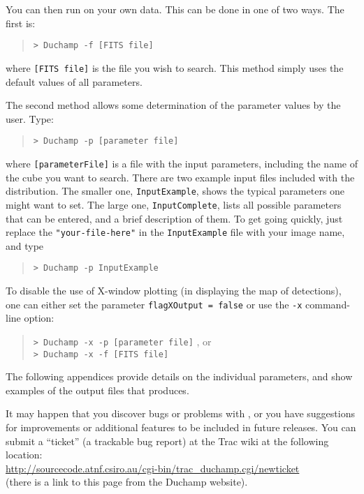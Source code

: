 You can then run \duchamp on your own data. This can be done in one
of two ways. The first is:
\begin{quote}
{\footnotesize
\texttt{> Duchamp -f [FITS file]}
}
\end{quote}
where \texttt{[FITS file]} is the file you wish to search. This method
simply uses the default values of all parameters.

The second method allows some determination of the parameter values by
the user. Type:
\begin{quote}
{\footnotesize
\texttt{> Duchamp -p [parameter file]}
}
\end{quote}
where \texttt{[parameterFile]} is a file with the input parameters,
including the name of the cube you want to search. There are two
example input files included with the distribution. The smaller one,
\texttt{InputExample}, shows the typical parameters one might want to
set. The large one, \texttt{InputComplete}, lists all possible
parameters that can be entered, and a brief description of them. To
get going quickly, just replace the \texttt{"your-file-here"} in the
\texttt{InputExample} file with your image name, and type
\begin{quote}
{\footnotesize
\texttt{> Duchamp -p InputExample}
}
\end{quote}

To disable the use of X-window plotting (in displaying the map of
detections), one can either set the parameter \texttt{flagXOutput =
false} or use the \texttt{-x} command-line option:
\begin{quote}
{\footnotesize
\texttt{> Duchamp -x -p [parameter file]}
}, or\\
{\footnotesize
\texttt{> Duchamp -x -f [FITS file]}
}
\end{quote}

The following appendices provide details on the individual parameters,
and show examples of the output files that \duchamp produces.

It may happen that you discover bugs or problems with \duchamp, or you
have suggestions for improvements or additional features to be
included in future releases. You can submit a ``ticket'' (a trackable
bug report) at the \duchamp Trac wiki at the following location:\\
\href{http://sourcecode.atnf.csiro.au/cgi-bin/trac\_duchamp.cgi/newticket}%
{\footnotesize 
http://sourcecode.atnf.csiro.au/cgi-bin/trac\_duchamp.cgi/newticket}
\\(there is a link to this page from the Duchamp website).

